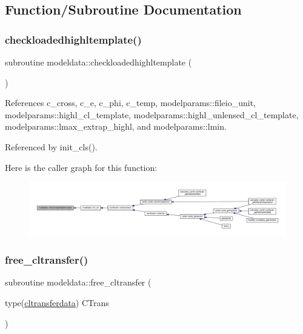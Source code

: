 \subsection{Function/\+Subroutine Documentation}
\mbox{\label{namespacemodeldata_a031eb48cced394c893960d706797a651}} 
\subsubsection{\texorpdfstring{checkloadedhighltemplate()}{checkloadedhighltemplate()}}
{\footnotesize\ttfamily subroutine modeldata\+::checkloadedhighltemplate (\begin{DoxyParamCaption}{ }\end{DoxyParamCaption})}



References c\+\_\+cross, c\+\_\+e, c\+\_\+phi, c\+\_\+temp, modelparams\+::fileio\+\_\+unit, modelparams\+::highl\+\_\+cl\+\_\+template, modelparams\+::highl\+\_\+unlensed\+\_\+cl\+\_\+template, modelparams\+::lmax\+\_\+extrap\+\_\+highl, and modelparams\+::lmin.



Referenced by init\+\_\+cls().

Here is the caller graph for this function\+:
\nopagebreak
\begin{figure}[H]
\begin{center}
\leavevmode
\includegraphics[width=350pt]{namespacemodeldata_a031eb48cced394c893960d706797a651_icgraph}
\end{center}
\end{figure}
\mbox{\label{namespacemodeldata_a2d6ecb98a3edf71d3e3ed3ee1ffb82d1}} 
\subsubsection{\texorpdfstring{free\+\_\+cltransfer()}{free\_cltransfer()}}
{\footnotesize\ttfamily subroutine modeldata\+::free\+\_\+cltransfer (\begin{DoxyParamCaption}\item[{type(\mbox{\hyperlink{structmodeldata_1_1cltransferdata}{cltransferdata}})}]{C\+Trans }\end{DoxyParamCaption})}



